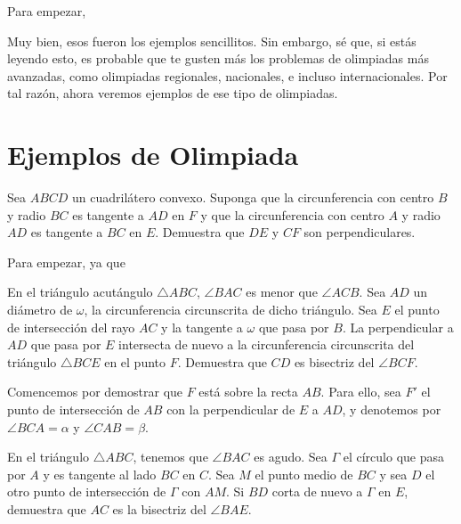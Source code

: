 \documentclass{article}
\begin{document}
\begin{solucion}
    Para empezar,
\end{solucion}

Muy bien, esos fueron los ejemplos sencillitos. Sin embargo, sé que, si
estás leyendo esto, es probable que te gusten más los problemas de 
olimpiadas más avanzadas, como olimpiadas regionales, nacionales, e incluso
internacionales. Por tal razón, ahora veremos ejemplos de ese tipo de 
olimpiadas.

\section*{Ejemplos de Olimpiada}

\begin{ejemplo}
    Sea $ABCD$ un cuadrilátero convexo. Suponga que la circunferencia con 
    centro $B$ y radio $BC$ es tangente a $AD$ en $F$ y que la circunferencia
    con centro $A$ y radio $AD$ es tangente a $BC$ en $E$. Demuestra que $DE$
    y $CF$ son perpendiculares.
\end{ejemplo}

\begin{solucion}
    Para empezar, ya que
\end{solucion}

\begin{ejemplo}
    En el triángulo acutángulo $\triangle ABC$, $\angle BAC$ es menor que
    $\angle ACB$. Sea $AD$ un diámetro de $\omega$, la circunferencia
    circunscrita de dicho triángulo. Sea $E$ el punto de intersección del rayo 
    $AC$ y la tangente a $\omega$ que pasa por $B$. La perpendicular a $AD$ que
    pasa por $E$ intersecta de nuevo a la circunferencia circunscrita del 
    triángulo $\triangle BCE$ en el punto $F$. Demuestra que $CD$ es bisectriz
    del $\angle BCF$.
\end{ejemplo}

\begin{solucion}
    Comencemos por demostrar que $F$ está sobre la recta $AB$. Para ello,
    sea $F'$ el punto de intersección de $AB$ con la perpendicular 
    de $E$ a $AD$, y denotemos por $\angle BCA = \alpha$ y 
    $\angle CAB = \beta$.
\end{solucion}

\begin{ejemplo}
    En el triángulo $\triangle ABC$, tenemos que $\angle BAC$ es agudo.
    Sea $\Gamma$ el círculo que pasa por $A$ y es tangente al lado
    $BC$ en $C$. Sea $M$ el punto medio de $BC$ y sea $D$ el otro 
    punto de intersección de $\Gamma$ con $AM$. Si $BD$ corta de nuevo 
    a $\Gamma$ en $E$, demuestra que $AC$ es la bisectriz del $\angle BAE$.
 \end{ejemplo}
\end{document}
